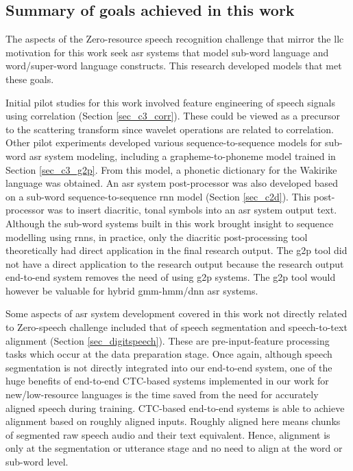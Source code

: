 {\subsection{Summary of goals achieved in this work}
The aspects of the Zero-resource speech recognition challenge \citep{versteegh2015zero} that mirror the \acrlong{llc} motivation for this work seek \acrshort{asr} systems that model sub-word language and word/super-word language constructs.  This research developed models that met these goals.

Initial pilot studies for this work involved feature engineering of speech signals using correlation (Section \ref{sec_c3_corr}).  These could be viewed as a precursor to the scattering transform since wavelet operations are related to correlation.  Other pilot experiments developed various sequence-to-sequence models for sub-word \acrshort{asr} system modeling, including a grapheme-to-phoneme model trained in Section \ref{sec_c3_g2p}.  From this model, a phonetic dictionary for the Wakirike language was obtained. An \acrshort{asr} system post-processor was also developed based on a sub-word sequence-to-sequence \acrshort{rnn} model (Section \ref{sec_c2d}).  This post-processor was to insert diacritic, tonal symbols into an \acrshort{asr} system output text.  Although the sub-word systems built in this work brought insight to sequence modelling using \acrfull{rnn}s, in practice, only the diacritic post-processing tool theoretically had direct application in the final research output.  The \acrfull{g2p} tool did not have a direct application to the research output because the research output end-to-end system removes the need of using \acrshort{g2p} systems.  The \acrshort{g2p} tool would however be valuable for hybrid \acrshort{gmm}-\acrshort{hmm}/\acrshort{dnn} \acrshort{asr} systems.

Some aspects of \acrshort{asr} system development covered in this work not directly related to Zero-speech challenge included that of speech segmentation and speech-to-text alignment (Section \ref{sec_digitspeech}).  These are pre-input-feature processing tasks which occur at the data preparation stage.  Once again, although speech segmentation is not directly integrated into our end-to-end system, one of the huge benefits of end-to-end CTC-based systems implemented in our work for new/low-resource languages is the time saved from the need for accurately aligned speech during training.  CTC-based end-to-end systems is able to achieve alignment based on roughly aligned inputs.  Roughly aligned here means chunks of segmented raw speech audio and their text equivalent.  Hence, alignment is only at the segmentation or utterance stage and no need to align at the word or sub-word level.

}
